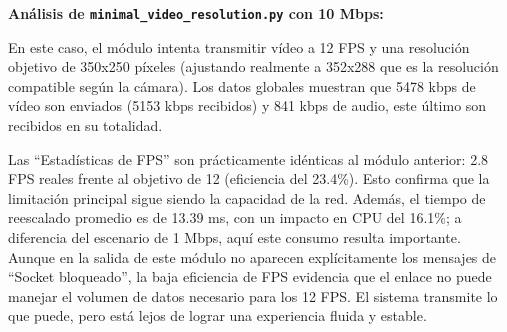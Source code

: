 \vspace{\baselineskip}

\textbf{Análisis de \texttt{minimal\_video\_resolution.py} con 10 Mbps:}
\vspace{\baselineskip}

En este caso, el módulo intenta transmitir vídeo a 12 FPS y una resolución objetivo de 350x250 píxeles (ajustando realmente a 352x288 que es la resolución compatible según la cámara). Los datos globales muestran que 5478 kbps de vídeo son enviados (5153 kbps recibidos) y 841 kbps de audio, este último son recibidos en su totalidad.
\vspace{\baselineskip}

Las ``Estadísticas de FPS'' son prácticamente idénticas al módulo anterior: 2.8 FPS reales frente al objetivo de 12 (eficiencia del 23.4\%). Esto confirma que la limitación principal sigue siendo la capacidad de la red. Además, el tiempo de reescalado promedio es de 13.39 ms, con un impacto en CPU del 16.1\%; a diferencia del escenario de 1 Mbps, aquí este consumo resulta importante. Aunque en la salida de este módulo no aparecen explícitamente los mensajes de ``Socket bloqueado'', la baja eficiencia de FPS evidencia que el enlace no puede manejar el volumen de datos necesario para los 12 FPS. El sistema transmite lo que puede, pero está lejos de lograr una experiencia fluida y estable.

\vspace{\baselineskip}

